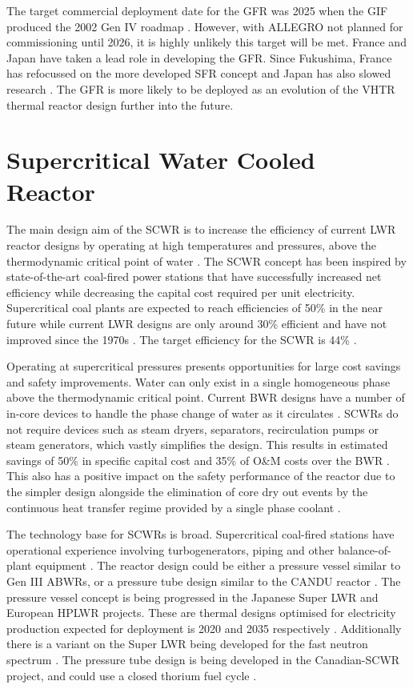 \documentclass[journal]{IEEEtran}
\begin{document}
The target commercial deployment date for the GFR was 2025 when the GIF produced the 2002 Gen IV roadmap \cite{GenIVRoadmap}. 
However, with ALLEGRO not planned for commissioning until 2026, it is highly unlikely this target will be met.
France and Japan have taken a lead role in developing the GFR.
Since Fukushima, France has refocussed on the more developed SFR concept and Japan has also slowed research \cite{GenIVForum}.
The GFR is more likely to be deployed as an evolution of the VHTR thermal reactor design further into the future.

\section{Supercritical Water Cooled Reactor}
The main design aim of the SCWR is to increase the efficiency of current LWR reactor designs by operating at high temperatures and pressures, above the thermodynamic critical point of water \cite{GenIVRoadmap}.
The SCWR concept has been inspired by state-of-the-art coal-fired power stations that have successfully increased net efficiency while decreasing the capital cost required per unit electricity.
Supercritical coal plants are expected to reach efficiencies of 50\% in the near future while current LWR designs are only around 30\% efficient and have not improved since the 1970s \cite{GenIVForum}.
The target efficiency for the SCWR is 44\% \cite{Marques2010a}.

Operating at supercritical pressures presents opportunities for large cost savings and safety improvements. 
Water can only exist in a single homogeneous phase above the thermodynamic critical point.
Current BWR designs have a number of in-core devices to handle the phase change of water as it circulates \cite{Marques2010a}.
SCWRs do not require devices such as steam dryers, separators, recirculation pumps or steam generators, which vastly simplifies the design.
This results in estimated savings of 50\% in specific capital cost and 35\% of O\&M costs over the BWR \cite{GenIVRoadmap}.
This also has a positive impact on the safety performance of the reactor due to the simpler design alongside the elimination of core dry out events by the continuous heat transfer regime provided by a single phase coolant \cite{GenIVRoadmap}.

The technology base for SCWRs is broad. Supercritical coal-fired stations have operational experience involving turbogenerators, piping and other balance-of-plant equipment \cite{GenIVRoadmap}.
The reactor design could be either a pressure vessel similar to Gen III ABWRs, or a pressure tube design similar to the CANDU reactor \cite{Bhatnagar2011}.
The pressure vessel concept is being progressed in the Japanese Super LWR and European HPLWR projects. 
These are thermal designs optimised for electricity production expected for deployment is 2020 and 2035 respectively \cite{Locatelli2013}.
Additionally there is a variant on the Super LWR being developed for the fast neutron spectrum \cite{Locatelli2013}.
The pressure tube design is being developed in the Canadian-SCWR project, and could use a closed thorium fuel cycle \cite{Locatelli2013}.
\end{document}
